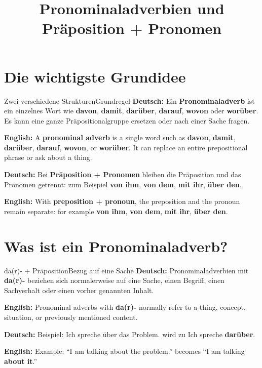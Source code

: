 \documentclass[a4paper,11pt]{article}
\title{Pronominaladverbien und Präposition + Pronomen}
\date{}
\newcommand{\GermanText}[1]{\textbf{Deutsch: }#1\par}
\newcommand{\EnglishText}[1]{{\small\color{SoftGray}\textbf{English: }#1\par}}
\begin{document}
    \maketitle
    \tableofcontents
    \newpage

    \section{Die wichtigste Grundidee}

        \begin{grammarentry}{Zwei verschiedene Strukturen}{Grundregel}
            \GermanText{Ein \textbf{Pronominaladverb} ist ein einzelnes Wort wie \textbf{davon}, \textbf{damit}, \textbf{darüber}, \textbf{darauf}, \textbf{wovon} oder \textbf{worüber}. Es kann eine ganze Präpositionalgruppe ersetzen oder nach einer Sache fragen.}
            \EnglishText{A \textbf{pronominal adverb} is a single word such as \textbf{davon}, \textbf{damit}, \textbf{darüber}, \textbf{darauf}, \textbf{wovon}, or \textbf{worüber}. It can replace an entire prepositional phrase or ask about a thing.}

            \GermanText{Bei \textbf{Präposition + Pronomen} bleiben die Präposition und das Pronomen getrennt: zum Beispiel \textbf{von ihm}, \textbf{von dem}, \textbf{mit ihr}, \textbf{über den}.}
            \EnglishText{With \textbf{preposition + pronoun}, the preposition and the pronoun remain separate: for example \textbf{von ihm}, \textbf{von dem}, \textbf{mit ihr}, \textbf{über den}.}
        \end{grammarentry}

    \section{Was ist ein Pronominaladverb?}

        \begin{grammarentry}{da(r)- + Präposition}{Bezug auf eine Sache}
            \GermanText{Pronominaladverbien mit \textbf{da(r)-} beziehen sich normalerweise auf eine Sache, einen Begriff, einen Sachverhalt oder einen vorher genannten Inhalt.}
            \EnglishText{Pronominal adverbs with \textbf{da(r)-} normally refer to a thing, concept, situation, or previously mentioned content.}

            \GermanText{Beispiel: \glqq Ich spreche über das Problem.\grqq{} wird zu \glqq Ich spreche \textbf{darüber}.\grqq{}}
            \EnglishText{Example: ``I am talking about the problem.'' becomes ``I am talking \textbf{about it}.''}
        \end{grammarentry}
\end{document}
